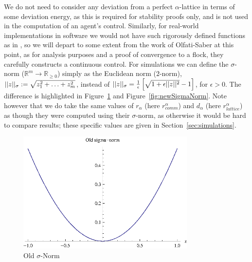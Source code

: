 \documentclass[10pt, conference, compsocconf]{IEEEtran}
\begin{document}
We do not need to consider any deviation from a perfect $\alpha$-lattice in terms of some deviation energy, as this is required for stability proofs only, and is not used in the computation of an agent's control.
%
Similarly, for real-world implementations in software we would not have such rigorously defined functions as in \cite{os2006}, so we will depart to some extent from the work of Olfati-Saber at this point, as for analysis purposes and a proof of convergence to a flock, they carefully constructs a continuous control.
%
For simulations we can define the $\sigma$-norm ($\mathbb{R}^m \rightarrow \mathbb{R}_{\geq 0}$) simply as the Euclidean norm ($2$-norm), $\lvert\lvert z\rvert\rvert_{\sigma} := \sqrt{z_1^2 + \ldots + z_m^2}$, instead of $\lvert\lvert z\rvert\rvert_{\sigma} = \frac{1}{\epsilon}\left[\sqrt{1 + \epsilon\lvert\lvert z\rvert\rvert^2} - 1\right]$, for $\epsilon > 0$.  The difference is highlighted in Figure~\ref{fig:oldSigmaNorm} and Figure~\ref{fig:newSigmaNorm}.
%
Note however that we do take the same values of $r_{\alpha}$ (here $r_{comm}^{\alpha}$) and $d_{\alpha}$ (here $r_{lattice}^{\alpha}$) as though they were computed using their $\sigma$-norm, as otherwise it would be hard to compare results; these specific values are given in Section~\ref{sec:simulations}.

\begin{figure}[!htb]
  \begin{center}
    \includegraphics[width=3.5in]{sigmaNormOld}
  \end{center}

  \caption{\small Old $\sigma$-Norm}
  \label{fig:oldSigmaNorm}
\end{figure}
\end{document}
